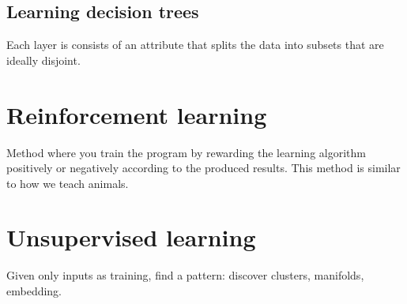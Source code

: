 \documentclass[11pt]{article}
\begin{document}
\subsection{Learning decision trees}
\label{sec:org031237a}
Each layer is consists of an attribute that splits the data into subsets that are
ideally disjoint.
\section{Reinforcement learning}
\label{sec:orgc988d77}
Method where you train the program by rewarding the learning algorithm positively or
negatively according to the produced results. This method is similar to how we teach
animals.
\section{Unsupervised learning}
\label{sec:orgf13811b}
Given only inputs as training, find a pattern: discover clusters, manifolds, embedding.
\end{document}
